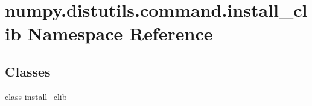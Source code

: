 \hypertarget{namespacenumpy_1_1distutils_1_1command_1_1install__clib}{}\section{numpy.\+distutils.\+command.\+install\+\_\+clib Namespace Reference}
\label{namespacenumpy_1_1distutils_1_1command_1_1install__clib}
\subsection*{Classes}
\begin{DoxyCompactItemize}
\item 
class \hyperlink{classnumpy_1_1distutils_1_1command_1_1install__clib_1_1install__clib}{install\+\_\+clib}
\end{DoxyCompactItemize}
